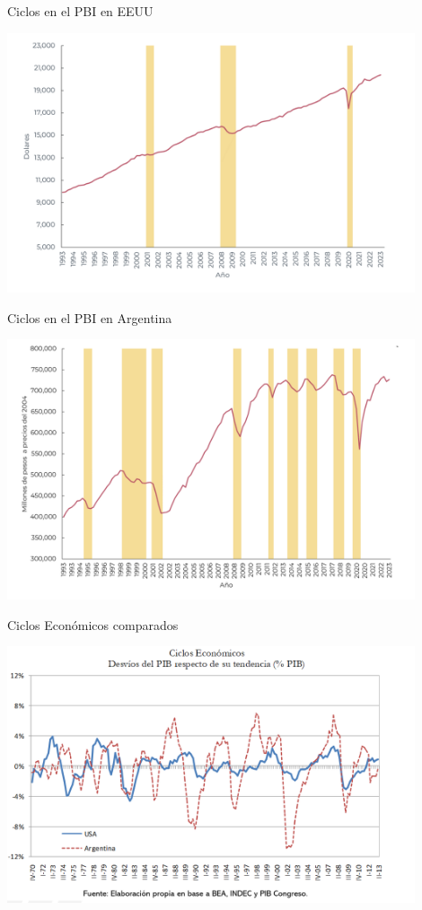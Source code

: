 \documentclass{beamer}
\begin{document}
\begin{frame}{Ciclos en el PBI en EEUU}

\centering\includegraphics[width=12cm]{../Figures/32.8.pdf}\

\end{frame}

\begin{frame}{Ciclos en el PBI en Argentina}

\centering\includegraphics[width=12cm]{../Figures/32.9.pdf}\

\end{frame}

\begin{frame}{Ciclos Económicos comparados}

    \centering\includegraphics[width=12cm]{../Figures/P12.png}
    
\end{frame}
\end{document}
